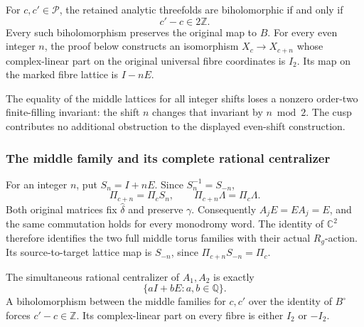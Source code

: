 \begin{theorem}
\label{wb:pshift:thm:classification}
For $c,c'\in\mathcal P$, the retained analytic threefolds are
biholomorphic if and only if
\[
                         c'-c\in2\mathbb Z.
 \tag{PS5}\label{wb:pshift:eq:classification}
\]
Every such biholomorphism preserves the original map to $B$. For every
even integer $n$, the proof below constructs an isomorphism
$X_c\longrightarrow X_{c+n}$ whose complex-linear part on the original
universal fibre coordinates is $I_2$. Its map on the marked fibre lattice
is $I-nE$.

The equality of the middle lattices for all integer shifts loses a
nonzero order-two finite-filling invariant: the shift $n$ changes that
invariant by $n\bmod2$. The cusp contributes no additional obstruction
to the displayed even-shift construction.
\end{theorem}

\subsubsection{The middle family and its complete rational centralizer}

For an integer $n$, put $S_n=I+nE$. Since $S_n^{-1}=S_{-n}$,
\[
 \Pi_{c+n}=\Pi_c S_n,\qquad
 \Pi_{c+n}\Lambda=\Pi_c\Lambda.
 \tag{PS6}\label{wb:pshift:eq:integer-shear}
\]
Both original matrices fix $\widehat\delta$ and preserve $\gamma$.
Consequently $A_jE=EA_j=E$, and the same commutation holds for every
monodromy word. The identity of $\mathbb C^2$ therefore identifies
the two full middle torus families with their actual $R_g$-action.
Its source-to-target lattice map is $S_{-n}$, since
$\Pi_{c+n}S_{-n}=\Pi_c$.

\begin{lemma}
\label{wb:pshift:lem:centralizer}
The simultaneous rational centralizer of $A_1,A_2$ is exactly
\[
 \{aI+bE:a,b\in\mathbb Q\}.
 \tag{PS7}\label{wb:pshift:eq:centralizer}
\]
A biholomorphism between the middle families for $c,c'$ over the
identity of $B^\circ$ forces $c'-c\in\mathbb Z$. Its complex-linear
part on every fibre is either $I_2$ or $-I_2$.
\end{lemma}

